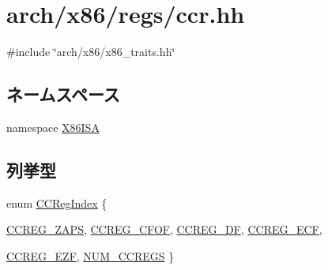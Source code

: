 \hypertarget{ccr_8hh}{
\section{arch/x86/regs/ccr.hh}
\label{ccr_8hh}
}
{\ttfamily \#include \char`\"{}arch/x86/x86\_\-traits.hh\char`\"{}}\par
\subsection*{ネームスペース}
\begin{DoxyCompactItemize}
\item 
namespace \hyperlink{namespaceX86ISA}{X86ISA}
\end{DoxyCompactItemize}
\subsection*{列挙型}
\begin{DoxyCompactItemize}
\item 
enum \hyperlink{namespaceX86ISA_ac8fc3c727b3f9650424d1091e300aab7}{CCRegIndex} \{ \par
\hyperlink{namespaceX86ISA_ac8fc3c727b3f9650424d1091e300aab7a20181ee9d00667dc2b36727a17844862}{CCREG\_\-ZAPS}, 
\hyperlink{namespaceX86ISA_ac8fc3c727b3f9650424d1091e300aab7a89b365a60bc324e3530e2faec43ca502}{CCREG\_\-CFOF}, 
\hyperlink{namespaceX86ISA_ac8fc3c727b3f9650424d1091e300aab7a0a974d0c69071660268c75f253b51773}{CCREG\_\-DF}, 
\hyperlink{namespaceX86ISA_ac8fc3c727b3f9650424d1091e300aab7a0b7da2f01e422ca2f262640923e57867}{CCREG\_\-ECF}, 
\par
\hyperlink{namespaceX86ISA_ac8fc3c727b3f9650424d1091e300aab7a3c6a9b31dbeae235e63a20e4125a729c}{CCREG\_\-EZF}, 
\hyperlink{namespaceX86ISA_ac8fc3c727b3f9650424d1091e300aab7ab86add752c1b575782da1561eaf31871}{NUM\_\-CCREGS}
 \}
\end{DoxyCompactItemize}
